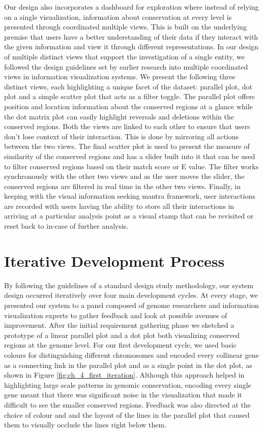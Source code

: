 Our design also incorporates a dashboard for exploration where instead of relying on a single visualization, information about conservation at every level is presented through coordinated multiple views. This is built on the underlying premise that users have a better understanding of their data if they interact with the given information and view it through different representations\cite{Roberts}. In our design of multiple distinct views that support the investigation of a single entity, we followed the design guidelines set by earlier research into multiple coordinated views in information visualization systems\cite{WangBaldonado}. We present the following three distinct views, each highlighting a unique facet of the dataset: parallel plot, dot plot and a simple scatter plot that acts as a filter toggle. The parallel plot offers position and location information about the conserved regions at a glance while the dot matrix plot can easily highlight reversals and deletions within the conserved regions. Both the views are linked to each other to ensure that users don't lose context of their interaction. This is done by mirroring all actions between the two views. The final scatter plot is used to present the measure of similarity of the conserved regions and has a slider built into it that can be used to filter conserved regions based on their match score or E value. The filter works synchronously with the other two views and as the user moves the slider, the conserved regions are filtered in real time in the other two views. Finally, in keeping with the visual information seeking mantra framework, user interactions are recorded with users having the ability to store all their interactions in arriving at a particular analysis point as a visual stamp that can be revisited or reset back to in-case of further analysis.

\section{Iterative Development Process}
By following the guidelines of a standard design study methodology\cite{5290695}, our system design occurred iteratively over four main development cycles. At every stage, we presented our system to a panel composed of genome researchers and information visualization experts to gather feedback and look at possible avenues of improvement. After the initial requirement gathering phase we sketched a prototype of a linear parallel plot and a dot plot both visualizing conserved regions at the genome level. For our first development cycle, we used basic colours for distinguishing different chromosomes and encoded every collinear gene as a connecting link in the parallel plot and as a single point in the dot plot, as shown in Figure \ref{fig:ch_4_first_iteration}. Although this approach helped in highlighting large scale patterns in genomic conservation, encoding every single gene meant that there was significant noise in the visualization that made it difficult to see the smaller conserved regions. Feedback was also directed at the choice of colour and and the layout of the lines in the parallel plot that caused them to visually occlude the lines right below them.


